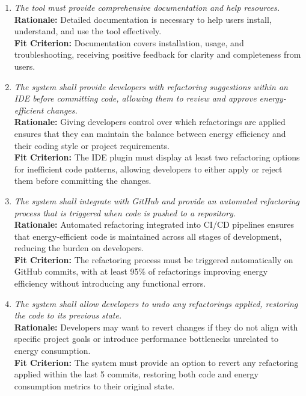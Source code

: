 \documentclass[12pt]{article}
\begin{document}
\begin{enumerate}[label=FR \arabic*., wide=0pt, leftmargin=*]
    {\bf Fit Criterion:} Reports are clear, well-structured, and provide actionable insights, allowing users to easily understand the results.
    \item \emph{The tool must provide comprehensive documentation and help resources.}\\[2mm]
    {\bf Rationale:} Detailed documentation is necessary to help users install, understand, and use the tool effectively.\\
    {\bf Fit Criterion:} Documentation covers installation, usage, and troubleshooting, receiving positive feedback for clarity and completeness from users.
    \item \emph{The system shall provide developers with refactoring suggestions within an IDE before committing code, allowing them to review and approve energy-efficient changes.}\\[2mm]
    {\bf Rationale:} Giving developers control over which refactorings are applied ensures that they can maintain the balance between energy efficiency and their coding style or project requirements.\\
    {\bf Fit Criterion:} The IDE plugin must display at least two refactoring options for inefficient code patterns, allowing developers to either apply or reject them before committing the changes.
    \item \emph{The system shall integrate with GitHub and provide an automated refactoring process that is triggered when code is pushed to a repository.}\\[2mm]
    {\bf Rationale:} Automated refactoring integrated into CI/CD pipelines ensures that energy-efficient code is maintained across all stages of development, reducing the burden on developers.\\
    {\bf Fit Criterion:} The refactoring process must be triggered automatically on GitHub commits, with at least 95\% of refactorings improving energy efficiency without introducing any functional errors.
    \item \emph{The system shall allow developers to undo any refactorings applied, restoring the code to its previous state.}\\[2mm]
    {\bf Rationale:} Developers may want to revert changes if they do not align with specific project goals or introduce performance bottlenecks unrelated to energy consumption.\\
    {\bf Fit Criterion:} The system must provide an option to revert any refactoring applied within the last 5 commits, restoring both code and energy consumption metrics to their original state.
\end{enumerate}
\end{document}
